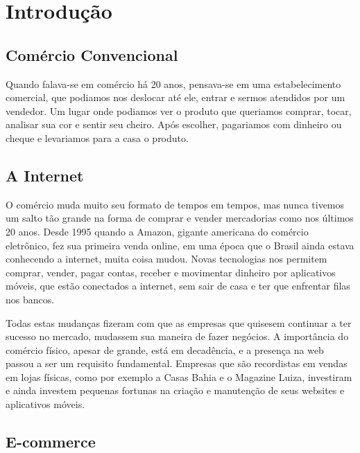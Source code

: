 \chapter{Introdução}

\section{Comércio Convencional}

Quando falava-se em comércio há 20 anos, pensava-se em uma estabelecimento comercial, que podiamos nos deslocar até ele, entrar e sermos atendidos por um vendedor. Um lugar onde podiamos ver o produto que queriamos comprar, tocar, analisar sua cor e sentir seu cheiro. Após escolher, pagariamos com dinheiro ou cheque e levariamos para a casa o produto.


\section{A Internet}

O comércio muda muito seu formato de tempos em tempos, mas nunca tivemos um salto tão grande na forma de comprar e vender mercadorias como nos últimos 20 anos. Desde 1995 quando a Amazon, gigante americana do comércio eletrônico, fez sua primeira venda online, em uma época que o Brasil ainda estava conhecendo a internet, muita coisa mudou. Novas tecnologias nos permitem comprar, vender, pagar contas, receber e movimentar dinheiro por aplicativos móveis, que estão conectados a internet, sem sair de casa e ter que enfrentar filas nos bancos.

Todas estas mudanças fizeram com que as empresas que quisesem continuar a ter sucesso no mercado, mudassem sua maneira de fazer negócios. A importância do comércio físico, apesar de grande, está em decadência, e a presença na web passou a ser um requisito fundamental. Empresas que são recordistas em vendas em lojas físicas, como por exemplo a Casas Bahia e o Magazine Luiza, investiram e ainda investem pequenas fortunas na criação e manutenção de seus websites e aplicativos móveis.


\section{E-commerce}

